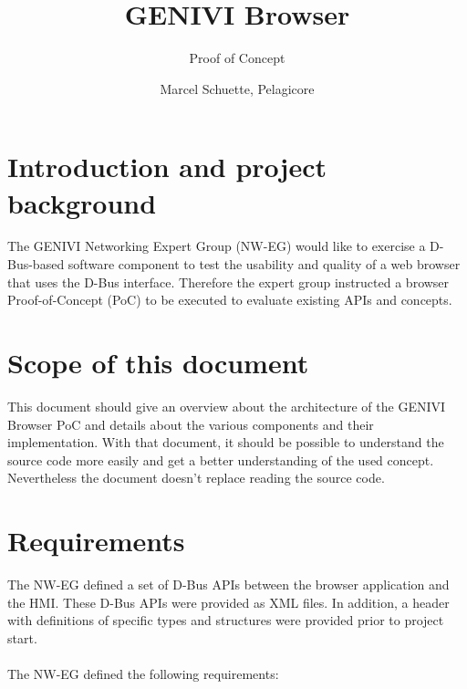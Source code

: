 \documentclass{pelagicore}
\begin{document}
\title {GENIVI Browser}
\subtitle {Proof of Concept}
\revisiondate{\today}
\author{Marcel Schuette, Pelagicore}
\filename{\jobname}
\bannerlogoheight{0.5in}
\usefrontmetadatatrue
{}

\maketitle
\tableofcontents \clearpage


\section{Introduction and project background}
The GENIVI Networking Expert Group (NW-EG) would like to exercise a D-Bus-based
software component to test the usability and quality of a web browser that uses
the D-Bus interface. Therefore the expert group instructed a browser
Proof-of-Concept (PoC) to be executed to evaluate existing APIs and concepts.

\section{Scope of this document}

This document should give an overview about the architecture of the GENIVI
Browser PoC and details about the various components and their implementation.
With that document, it should be possible to understand the source code more
easily and get a better understanding of the used concept. Nevertheless the
document doesn’t replace reading the source code.

\section{Requirements}

The NW-EG defined a set of D-Bus APIs between the browser application and the
HMI.  These D-Bus APIs were provided as XML files. In addition, a header with
definitions of specific types and structures were provided prior to project
start.
\\\\
The NW-EG defined the following requirements:
\end{document}

